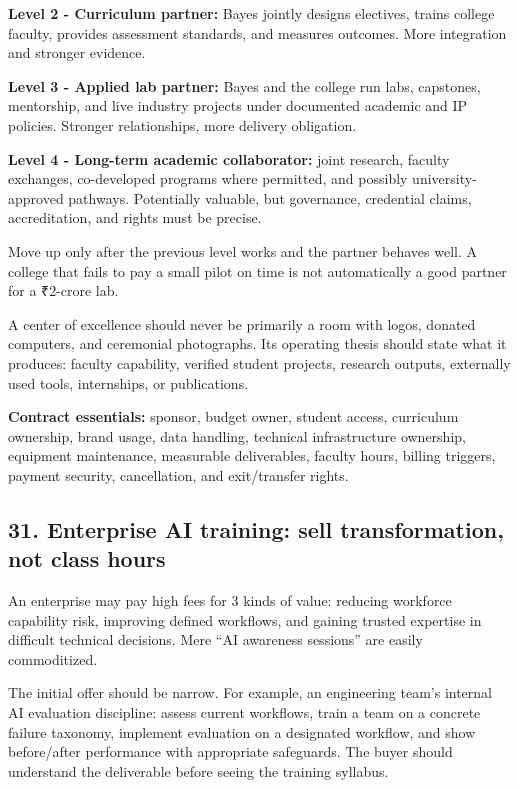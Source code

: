 \textbf{Level 2 - Curriculum partner:} Bayes jointly designs electives, trains college faculty, provides assessment standards, and measures outcomes. More integration and stronger evidence.

\textbf{Level 3 - Applied lab partner:} Bayes and the college run labs, capstones, mentorship, and live industry projects under documented academic and IP policies. Stronger relationships, more delivery obligation.

\textbf{Level 4 - Long-term academic collaborator:} joint research, faculty exchanges, co-developed programs where permitted, and possibly university-approved pathways. Potentially valuable, but governance, credential claims, accreditation, and rights must be precise.

Move up only after the previous level works and the partner behaves well. A college that fails to pay a small pilot on time is not automatically a good partner for a \textnormal{₹}2-crore lab.

A center of excellence should never be primarily a room with logos, donated computers, and ceremonial photographs. Its operating thesis should state what it produces: faculty capability, verified student projects, research outputs, externally used tools, internships, or publications.

\textbf{Contract essentials:} sponsor, budget owner, student access, curriculum ownership, brand usage, data handling, technical infrastructure ownership, equipment maintenance, measurable deliverables, faculty hours, billing triggers, payment security, cancellation, and exit/\allowbreak transfer rights.

\subsection{31. Enterprise AI training: sell transformation, not class hours}

An enterprise may pay high fees for 3 kinds of value: reducing workforce capability risk, improving defined workflows, and gaining trusted expertise in difficult technical decisions. Mere ``AI awareness sessions'' are easily commoditized.

The initial offer should be narrow. For example, an engineering team's internal AI evaluation discipline: assess current workflows, train a team on a concrete failure taxonomy, implement evaluation on a designated workflow, and show before/\allowbreak after performance with appropriate safeguards. The buyer should understand the deliverable before seeing the training syllabus.

